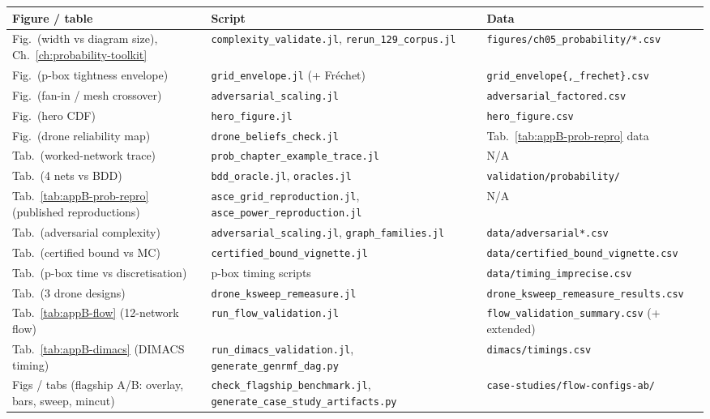 \documentclass[12pt]{report}
\providecommand{\filepath}[1]{\nolinkurl{#1}}
\begin{document}
{\footnotesize
\begin{longtable}{@{}p{4.2cm} p{4.7cm} p{4.2cm}@{}}
\toprule
Figure / table & Script & Data \\
\midrule
\endhead
Fig.\ (width vs diagram size), Ch.~\ref{ch:probability-toolkit} & \filepath{complexity_validate.jl}, \filepath{rerun_129_corpus.jl} & \filepath{figures/ch05\_probability/*.csv} \\
Fig.\ (p-box tightness envelope) & \filepath{grid_envelope.jl} (+ Fr\'echet) & \texttt{grid\_envelope\{,\_frechet\}.csv} \\
Fig.\ (fan-in / mesh crossover) & \filepath{adversarial_scaling.jl} & \filepath{adversarial_factored.csv} \\
Fig.\ (hero CDF) & \filepath{hero_figure.jl} & \filepath{hero_figure.csv} \\
Fig.\ (drone reliability map) & \filepath{drone_beliefs_check.jl} & Tab.~\ref{tab:appB-prob-repro} data \\
Tab.\ (worked-network trace) & \filepath{prob_chapter_example_trace.jl} & N/A \\
Tab.\ (4 nets vs BDD) & \filepath{bdd_oracle.jl}, \filepath{oracles.jl} & \filepath{validation/probability/} \\
Tab.~\ref{tab:appB-prob-repro} (published reproductions) & \filepath{asce_grid_reproduction.jl}, \filepath{asce_power_reproduction.jl} & N/A \\
Tab.\ (adversarial complexity) & \filepath{adversarial_scaling.jl}, \filepath{graph_families.jl} & \filepath{data/adversarial*.csv} \\
Tab.\ (certified bound vs MC) & \filepath{certified_bound_vignette.jl} & \filepath{data/certified\_bound\_vignette.csv} \\
Tab.\ (p-box time vs discretisation) & p-box timing scripts & \filepath{data/timing\_imprecise.csv} \\
Tab.\ (3 drone designs) & \filepath{drone_ksweep_remeasure.jl} & \filepath{drone_ksweep_remeasure_results.csv} \\
Tab.~\ref{tab:appB-flow} (12-network flow) & \filepath{run_flow_validation.jl} & \filepath{flow_validation_summary.csv} (+ extended) \\
Tab.~\ref{tab:appB-dimacs} (DIMACS timing) & \filepath{run_dimacs_validation.jl}, \filepath{generate_genrmf_dag.py} & \filepath{dimacs/timings.csv} \\
Figs / tabs (flagship A/B: overlay, bars, sweep, mincut) & \filepath{check_flagship_benchmark.jl}, \filepath{generate_case_study_artifacts.py} & \filepath{case-studies/flow-configs-ab/} \\

\end{longtable}}
\end{document}
